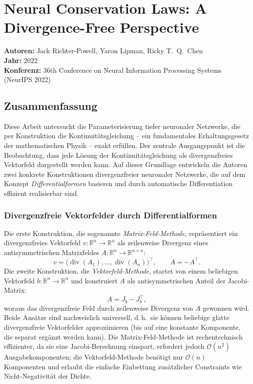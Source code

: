 \documentclass[a4paper,12pt]{article}
\begin{document}
\section*{Neural Conservation Laws: A Divergence-Free Perspective}
\textbf{Autoren:} Jack Richter-Powell, Yaron Lipman, Ricky T.\ Q.\ Chen \\
\textbf{Jahr:} 2022 \\
\textbf{Konferenz:} 36th Conference on Neural Information Processing Systems (NeurIPS 2022)

\subsection*{Zusammenfassung}

Diese Arbeit untersucht die Parameterisierung tiefer neuronaler Netzwerke, die per Konstruktion die
Kontinuit\"atsgleichung -- ein fundamentales Erhaltungsgesetz der mathematischen Physik -- exakt
erf\"ullen. Der zentrale Ausgangspunkt ist die Beobachtung, dass jede L\"osung der Kontinuit\"atsgleichung
als divergenzfreies Vektorfeld dargestellt werden kann. Auf dieser Grundlage entwickeln die Autoren
zwei konkrete Konstruktionen divergenzfreier neuronaler Netzwerke, die auf dem Konzept
\emph{Differentialformen} basieren und durch automatische Differentiation effizient realisierbar sind.

\subsubsection*{Divergenzfreie Vektorfelder durch Differentialformen}

Die erste Konstruktion, die sogenannte \emph{Matrix-Feld-Methode}, repr\"asentiert ein
divergenzfreies Vektorfeld $v : \mathbb{R}^n \to \mathbb{R}^n$ als zeilenweise Divergenz eines
antisymmetrischen Matrixfeldes $A : \mathbb{R}^n \to \mathbb{R}^{n \times n}$:
\[
    v = \bigl(\operatorname{div}(A_1), \ldots, \operatorname{div}(A_n)\bigr)^\top,
    \qquad A = -A^\top.
\]
Die zweite Konstruktion, die \emph{Vektorfeld-Methode}, startet von einem beliebigen Vektorfeld
$b : \mathbb{R}^n \to \mathbb{R}^n$ und konstruiert $A$ als antisymmetrischen Anteil der
Jacobi-Matrix:
\[
    A = J_b - J_b^\top,
\]
woraus das divergenzfreie Feld durch zeilenweise Divergenz von $A$ gewonnen wird. Beide Ans\"atze
sind nachweislich universell, d.\,h.\ sie k\"onnen beliebige glatte divergenzfreie Vektorfelder
approximieren (bis auf eine konstante Komponente, die separat erg\"anzt werden kann). Die
Matrix-Feld-Methode ist rechentechnisch effizienter, da sie eine Jacobi-Berechnung einspart,
erfordert jedoch $\mathcal{O}(n^2)$ Ausgabekomponenten; die Vektorfeld-Methode ben\"otigt nur
$\mathcal{O}(n)$ Komponenten und erlaubt die einfache Einbettung zus\"atzlicher Constraints
wie Nicht-Negativit\"at der Dichte.
\end{document}
